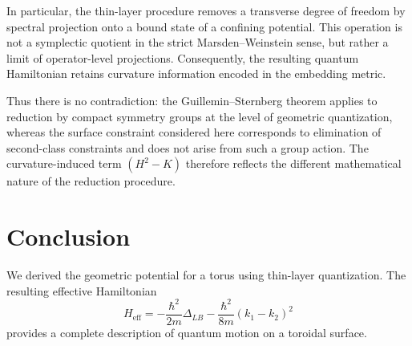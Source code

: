 \documentclass[11pt]{article}
\begin{document}
In particular, the thin-layer procedure removes a transverse degree of freedom by spectral projection onto a bound state of a confining potential. This operation is not a symplectic quotient in the strict Marsden--Weinstein sense, but rather a limit of operator-level projections. Consequently, the resulting quantum Hamiltonian retains curvature information encoded in the embedding metric.

Thus there is no contradiction: the Guillemin--Sternberg theorem applies to reduction by compact symmetry groups at the level of geometric quantization, whereas the surface constraint considered here corresponds to elimination of second-class constraints and does not arise from such a group action. The curvature-induced term $(H^2-K)$ therefore reflects the different mathematical nature of the reduction procedure.

\section{Conclusion}

We derived the geometric potential for a torus using thin-layer quantization. The resulting effective Hamiltonian
\begin{equation}
H_{\text{eff}} = -\frac{\hbar^2}{2m}\Delta_{LB} - \frac{\hbar^2}{8m}(k_1 - k_2)^2
\end{equation}
provides a complete description of quantum motion on a toroidal surface.
\end{document}
